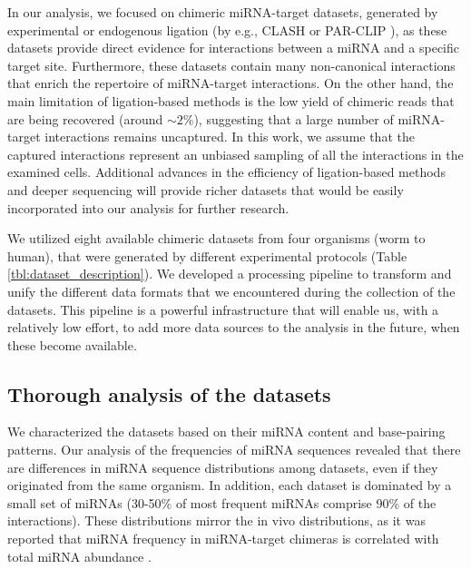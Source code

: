 \documentclass{bmcart}
\begin{document}
In our analysis, we focused on chimeric miRNA-target datasets, generated by experimental or endogenous ligation (by e.g., CLASH \cite{helwak2013mapping} or PAR-CLIP \cite{grosswendt2014unambiguous}), as these datasets provide direct evidence for interactions between a miRNA and a specific target site. Furthermore, these datasets contain many non-canonical interactions that enrich the repertoire of miRNA-target interactions. On the other hand, the main limitation of ligation-based methods is the low yield of chimeric reads that are being recovered (around $\sim 2$\%), suggesting that a large number of miRNA-target interactions remains uncaptured. In this work, we assume that the captured interactions represent an unbiased sampling of all the interactions in the examined cells. Additional advances in the efficiency of ligation-based methods and deeper sequencing will provide richer datasets that would be easily incorporated into our analysis for further research.  

We utilized eight available chimeric datasets from four organisms (worm to human), that were generated by different experimental protocols (Table \ref{tbl:dataset_description}). We developed a processing pipeline to transform and unify the different data formats that we encountered during the collection of the datasets. This pipeline is a powerful infrastructure that will enable us, with a relatively low effort, to add more data sources to the analysis in the future, when these become available. 

\subsection*{Thorough analysis of the datasets}
We characterized the datasets based on their miRNA content and base-pairing patterns.
Our analysis of the frequencies of miRNA sequences revealed that there are differences in miRNA sequence distributions among datasets, even if they originated from the same organism. In addition, each dataset is dominated by a small set of miRNAs (30-50\% of most frequent miRNAs comprise 90\% of the interactions). These distributions mirror the in vivo distributions, as it was reported that miRNA frequency in miRNA-target chimeras is correlated with total miRNA abundance \cite{darnell_moore2015mirna}.
\end{document}
